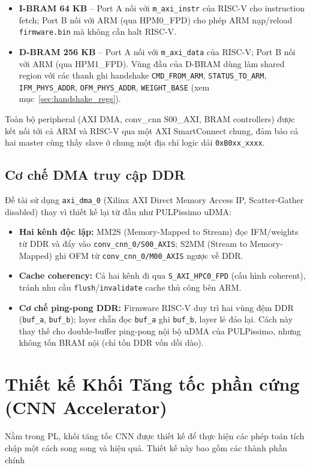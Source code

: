 \begin{itemize}
    \item \textbf{I-BRAM 64 KB} -- Port A nối với \texttt{m\_axi\_instr} của RISC-V cho instruction fetch; Port B nối với ARM (qua HPM0\_FPD) cho phép ARM nạp/reload \texttt{firmware.bin} mà không cần halt RISC-V.
    \item \textbf{D-BRAM 256 KB} -- Port A nối với \texttt{m\_axi\_data} của RISC-V; Port B nối với ARM (qua HPM1\_FPD). Vùng đầu của D-BRAM dùng làm shared region với các thanh ghi handshake \texttt{CMD\_FROM\_ARM}, \texttt{STATUS\_TO\_ARM}, \texttt{IFM\_PHYS\_ADDR}, \texttt{OFM\_PHYS\_ADDR}, \texttt{WEIGHT\_BASE} (xem mục~\ref{sec:handshake_regs}).
\end{itemize}

Toàn bộ peripheral (AXI DMA, conv\_cnn S00\_AXI, BRAM controllers) được kết nối tới cả ARM và RISC-V qua một AXI SmartConnect chung, đảm bảo cả hai master cùng thấy slave ở chung một địa chỉ logic dải \texttt{0xB0xx\_xxxx}.

\subsection{Cơ chế DMA truy cập DDR}
\label{ssec:dma_design}
Đề tài sử dụng \texttt{axi\_dma\_0} (Xilinx AXI Direct Memory Access IP, Scatter-Gather disabled) thay vì thiết kế lại từ đầu như PULPissimo uDMA:

\begin{itemize}
    \item \textbf{Hai kênh độc lập:} MM2S (Memory-Mapped to Stream) đọc IFM/weights từ DDR và đẩy vào \texttt{conv\_cnn\_0/S00\_AXIS}; S2MM (Stream to Memory-Mapped) ghi OFM từ \texttt{conv\_cnn\_0/M00\_AXIS} ngược về DDR.
    \item \textbf{Cache coherency:} Cả hai kênh đi qua \texttt{S\_AXI\_HPC0\_FPD} (cấu hình coherent), tránh nhu cầu \texttt{flush}/\texttt{invalidate} cache thủ công bên ARM.
    \item \textbf{Cơ chế ping-pong DDR:} Firmware RISC-V duy trì hai vùng đệm DDR (\texttt{buf\_a}, \texttt{buf\_b}); layer chẵn đọc \texttt{buf\_a} ghi \texttt{buf\_b}, layer lẻ đảo lại. Cách này thay thế cho double-buffer ping-pong nội bộ uDMA của PULPissimo, nhưng không tốn BRAM nội (chỉ tốn DDR vốn dồi dào).
\end{itemize}

\newpage
\section{Thiết kế Khối Tăng tốc phần cứng (CNN Accelerator)}
Nằm trong PL, khối tăng tốc CNN được thiết kế để thực hiện các phép toán tích chập
một cách song song và hiệu quả. Thiết kế này bao gồm các thành phần chính \cite{fpga2}
\label{sec:cnn_accelerator}

